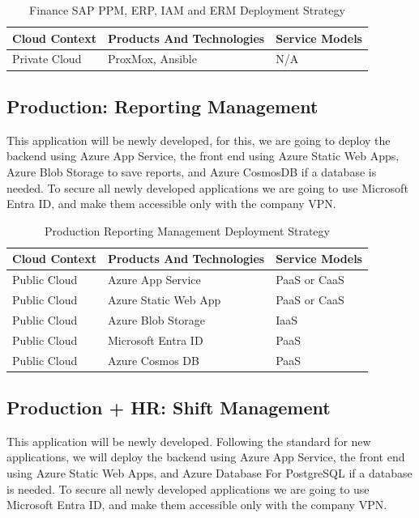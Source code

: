 \documentclass{llncs}
\begin{document}
\begin{table}[h!]
    \centering
    \begin{tabular}{lll}
        \hline
        \textbf{Cloud Context} & \textbf{Products And Technologies} & \textbf{Service Models} \\
        \hline
        Private Cloud          & ProxMox, Ansible                   & N/A                     \\
        \hline
    \end{tabular}
    \caption{Finance SAP PPM, ERP, IAM and ERM Deployment Strategy}
\end{table}

\subsection{Production: Reporting Management}
This application will be newly developed, for this, we are going to deploy the backend using Azure App Service, the front end using Azure Static Web Apps, Azure Blob Storage to save reports, and Azure CosmosDB if a database is needed.
To secure all newly developed applications we are going to use Microsoft Entra ID, and make them accessible only with the company VPN.\\
\begin{table}[h!]
    \centering
    \begin{tabular}{lll}
        \hline
        \textbf{Cloud Context} & \textbf{Products And Technologies} & \textbf{Service Models} \\
        \hline
        Public Cloud           & Azure App Service                  & PaaS or CaaS            \\
        \hline
        Public Cloud           & Azure Static Web App               & PaaS or CaaS            \\
        \hline
        Public Cloud           & Azure Blob Storage                 & IaaS                    \\
        \hline
        Public Cloud           & Microsoft Entra ID                 & PaaS                    \\
        \hline
        Public Cloud           & Azure Cosmos DB                    & PaaS                    \\
        \hline
    \end{tabular}
    \caption{Production Reporting Management Deployment Strategy}
\end{table}


\subsection{Production + HR: Shift Management}
This application will be newly developed. Following the standard for new applications, we will deploy the backend using Azure App Service, the front end using Azure Static Web Apps, and Azure Database For PostgreSQL if a database is needed.
To secure all newly developed applications we are going to use Microsoft Entra ID, and make them accessible only with the company VPN.\\
\end{document}
